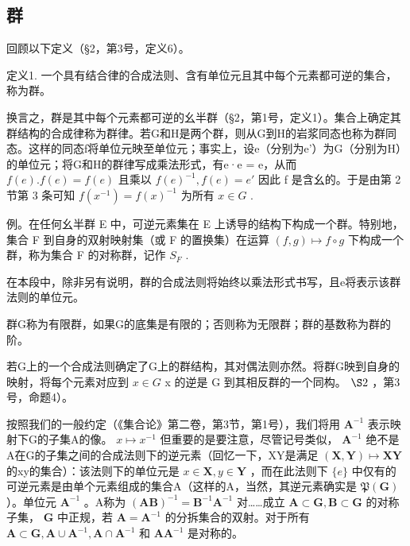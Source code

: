 \subsection{群}

回顾以下定义（§2，第3号，定义6）。

定义1. 一个具有结合律的合成法则、含有单位元且其中每个元素都可逆的集合，称为群。

换言之，群是其中每个元素都可逆的幺半群（§2，第1号，定义1）。集合上确定其群结构的合成律称为群律。若G和H是两个群，则从G到H的岩浆同态也称为群同态。这样的同态f将单位元映至单位元；事实上，设e（分别为e'）为G（分别为H）的单位元；将G和H的群律写成乘法形式，有e·e = e，从而 \(f(e).f(e) = f(e)\) 且乘以 \(f(e)^{-1}, f(e) = e'\) 因此 f 是含幺的。于是由第 2 节第 3 条可知 \(f(x^{-1}) = f(x)^{-1}\) 为所有 \(x \in G\) .

例。在任何幺半群 E 中，可逆元素集在 E 上诱导的结构下构成一个群。特别地，集合 F 到自身的双射映射集（或 F 的置换集）在运算 \((f, g) \mapsto f \circ g\) 下构成一个群，称为集合 F 的对称群，记作 \(S_{F}\) .

在本段中，除非另有说明，群的合成法则将始终以乘法形式书写，且e将表示该群法则的单位元。

群G称为有限群，如果G的底集是有限的；否则称为无限群；群的基数称为群的阶。

若G上的一个合成法则确定了G上的群结构，其对偶法则亦然。将群G映到自身的映射，将每个元素对应到 \(x \in G\) x 的逆是 G 到其相反群的一个同构。 \(\S 2\) ，第3号，命题4）。

按照我们的一般约定（《集合论》第二卷，第3节，第1号），我们将用 \(\mathbf{A}^{-1}\) 表示映射下G的子集A的像。 \(x \mapsto x^{-1}\) 但重要的是要注意，尽管记号类似， \(\mathbf{A}^{-1}\) 绝不是A在G的子集之间的合成法则下的逆元素（回忆一下，XY是满足 \((\mathbf{X}, \mathbf{Y}) \mapsto \mathbf{XY}\) 的xy的集合）：该法则下的单位元是 \(x \in \mathbf{X}, y \in \mathbf{Y}\) ，而在此法则下 \(\{e\}\) 中仅有的可逆元素是由单个元素组成的集合A（这样的A，当然，其逆元素确实是 \(\mathfrak{P}(\mathbf{G})\) ）。单位元 \(\mathbf{A}^{-1}\) 。A称为 \((\mathbf{AB})^{-1} = \mathbf{B}^{-1}\mathbf{A}^{-1}\) 对……成立 \(\mathbf{A} \subset \mathbf{G}, \mathbf{B} \subset \mathbf{G}\) 的对称子集， \(\mathbf{G}\) 中正规，若 \(\mathbf{A} = \mathbf{A}^{-1}\) 的分拆集合的双射。对于所有 \(\mathbf{A} \subset \mathbf{G}, \mathbf{A} \cup \mathbf{A}^{-1}, \mathbf{A} \cap \mathbf{A}^{-1}\) 和 \(\mathbf{AA}^{-1}\) 是对称的。

